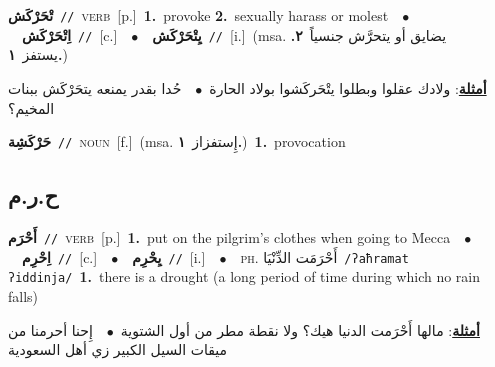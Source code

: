 \documentclass[10pt,a4paper,twoside]{article} %
\begin{document}
\begin{multicols}{2}
{\setlength\topsep{0pt}\textbf{\foreignlanguage{arabic}{تْحَرْكَش}}\ {\color{gray}\texttt{//}\color{black}}\ \textsc{verb}\ [p.]\ \textbf{1.}~provoke  \textbf{2.}~sexually harass or molest\ \ $\bullet$\ \ \setlength\topsep{0pt}\textbf{\foreignlanguage{arabic}{اِتْحَرْكَش}}\ {\color{gray}\texttt{//}\color{black}}\ [c.]\ \ $\bullet$\ \ \setlength\topsep{0pt}\textbf{\foreignlanguage{arabic}{يِتْحَرْكَش}}\ {\color{gray}\texttt{//}\color{black}}\ [i.]\ \color{gray}(msa. \foreignlanguage{arabic}{يضايق أو يتحرَّش جنسياً}~\foreignlanguage{arabic}{\textbf{٢.}}  \foreignlanguage{arabic}{يستفز}~\foreignlanguage{arabic}{\textbf{١.}})\color{black}\  \begin{flushright}\color{gray}\foreignlanguage{arabic}{\textbf{\underline{\foreignlanguage{arabic}{أمثلة}}}: ولادك عقلوا وبطلوا يتْحَركَشوا بولاد الحارة\ $\bullet$\ \  حُدا بقدر يمنعه يتحَرْكَش ببنات المخيم؟}\end{flushright}\color{black}} \vspace{2mm}

{\setlength\topsep{0pt}\textbf{\foreignlanguage{arabic}{حَرْكَشِة}}\ {\color{gray}\texttt{//}\color{black}}\ \textsc{noun}\ [f.]\ \color{gray}(msa. \foreignlanguage{arabic}{إِستفزاز}~\foreignlanguage{arabic}{\textbf{١.}})\color{black}\ \textbf{1.}~provocation\ } \vspace{2mm}

\vspace{-3mm}
\subsection*{\color{blue}\foreignlanguage{arabic}{ح.ر.م}\color{blue}{}} 

{\setlength\topsep{0pt}\textbf{\foreignlanguage{arabic}{أَحْرَم}}\ {\color{gray}\texttt{//}\color{black}}\ \textsc{verb}\ [p.]\ \textbf{1.}~put on the pilgrim's clothes when going to Mecca\ \ $\bullet$\ \ \setlength\topsep{0pt}\textbf{\foreignlanguage{arabic}{اِحْرِم}}\ {\color{gray}\texttt{//}\color{black}}\ [c.]\ \ $\bullet$\ \ \setlength\topsep{0pt}\textbf{\foreignlanguage{arabic}{يِحْرِم}}\ {\color{gray}\texttt{//}\color{black}}\ [i.]\ \ $\bullet$\ \ \textsc{ph.} \color{gray} \foreignlanguage{arabic}{أَحْرَمَت الدِّنْيَا}\color{black}\ {\color{gray}\texttt{/{\sffamily ʔaħramat ʔiddinja}/}\color{black}}\ \textbf{1.}~there is a drought (a long period of time during which no rain falls)\  \begin{flushright}\color{gray}\foreignlanguage{arabic}{\textbf{\underline{\foreignlanguage{arabic}{أمثلة}}}: مالها أَحْرَمت الدنيا هيك؟ ولا نقطة مطر من أول الشتوية\ $\bullet$\ \  إِحنا أحرمنا من ميقات السيل الكبير زي أهل السعودية}\end{flushright}\color{black}} \vspace{2mm}


\end{multicols}
\end{document}
